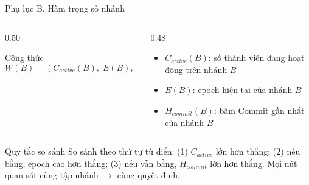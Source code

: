 \documentclass[t, aspectratio=169]{beamer}
\begin{document}
\begin{frame}[c]{Phụ lục B. Hàm trọng số nhánh}
	\begin{columns}[c]
		\begin{column}{0.50\textwidth}
			\begin{block}{Công thức}
				\centering
				\begin{equation*}
				W(B) = \left(C_{active}(B),\; E(B),\; H_{commit}(B)\right)
				\end{equation*}
			\end{block}
		\end{column}
		\begin{column}{0.48\textwidth}
			\footnotesize
			\begin{itemize}
				\setlength{\itemsep}{4pt}
				\item $C_{active}(B)$: số thành viên đang hoạt động trên nhánh $B$
				\item $E(B)$: epoch hiện tại của nhánh $B$
				\item $H_{commit}(B)$: băm Commit gần nhất của nhánh $B$
			\end{itemize}
		\end{column}
	\end{columns}
	\vspace{0.4em}
	\begin{alertblock}{Quy tắc so sánh}
		\footnotesize
		So sánh theo thứ tự từ điển: (1) $C_{active}$ lớn hơn thắng; (2) nếu bằng, epoch cao hơn thắng; (3) nếu vẫn bằng, $H_{commit}$ lớn hơn thắng. Mọi nút quan sát cùng tập nhánh $\to$ cùng quyết định.
	\end{alertblock}
\end{frame}
\end{document}
